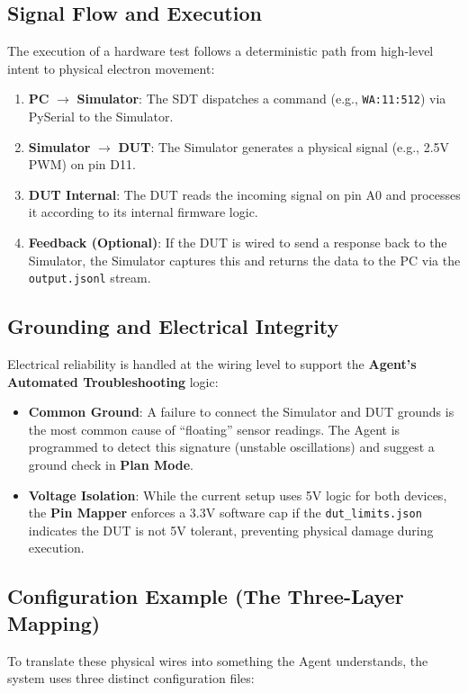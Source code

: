\documentclass[conference]{IEEEtran}
\begin{document}
\subsection{Signal Flow and Execution}
The execution of a hardware test follows a deterministic path from high-level intent to physical electron movement:
\begin{enumerate}
    \item \textbf{PC} $\rightarrow$ \textbf{Simulator}: The SDT dispatches a command (e.g., \texttt{WA:11:512}) via PySerial to the Simulator.
    \item \textbf{Simulator} $\rightarrow$ \textbf{DUT}: The Simulator generates a physical signal (e.g., 2.5V PWM) on pin D11.
    \item \textbf{DUT Internal}: The DUT reads the incoming signal on pin A0 and processes it according to its internal firmware logic.
    \item \textbf{Feedback (Optional)}: If the DUT is wired to send a response back to the Simulator, the Simulator captures this and returns the data to the PC via the \texttt{output.jsonl} stream.
\end{enumerate}

\subsection{Grounding and Electrical Integrity}
Electrical reliability is handled at the wiring level to support the \textbf{Agent's Automated Troubleshooting} logic:
\begin{itemize}
    \item \textbf{Common Ground}: A failure to connect the Simulator and DUT grounds is the most common cause of ``floating'' sensor readings. The Agent is programmed to detect this signature (unstable oscillations) and suggest a ground check in \textbf{Plan Mode}.
    \item \textbf{Voltage Isolation}: While the current setup uses 5V logic for both devices, the \textbf{Pin Mapper} enforces a 3.3V software cap if the \texttt{dut\_limits.json} indicates the DUT is not 5V tolerant, preventing physical damage during execution.
\end{itemize}

\subsection{Configuration Example (The Three-Layer Mapping)}
To translate these physical wires into something the Agent understands, the system uses three distinct configuration files:
\end{document}
